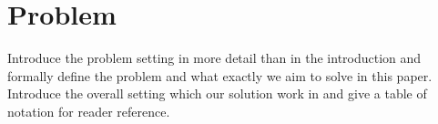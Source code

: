 \section{Problem}\label{sec:problemdef}

Introduce the problem setting in more detail than in the introduction and formally define the problem and what exactly we aim to solve in this paper.\\
Introduce the overall setting which our solution work in and give a table of notation for reader reference.